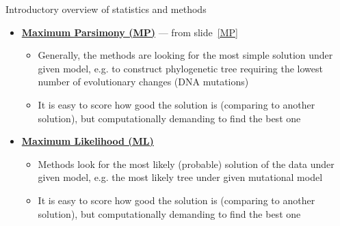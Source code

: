 \documentclass[compress, ucs, xelatex, 11pt, xcolor=svgnames,
	hyperref={
		bookmarks=true,
		unicode=true,
		colorlinks=true,
		pdftitle={Molecular data in R},
		plainpages=false,
		pdfauthor={Vojtech Zeisek},
		pdfsubject={Course about phylogeny and evolution in R},
		pdfcreator={XeLaTeX},
		pdfkeywords={R, evolution, phylogeny, molecular data},
		linkcolor=Tomato,
		anchorcolor=SaddleBrown,
		citecolor=Goldenrod,
		filecolor=DarkMagenta,
		menucolor=Sienna,
		urlcolor=DarkTurquoise,
		pdftex},
	url={hyphens, lowtilde} %
	]{beamer}
\begin{document}
\begin{frame}[allowframebreaks]{Introductory overview of statistics and methods}
\begin{itemize}
		\begin{itemize}
			\item Two variables are easily displayable in 2D xy-scatter plot (we can calculate correlation, whatever)
			\item In molecular data, each locus is more or less independent variable --- 1000~bp alignment has 1000 variables: How to display plot with 1000 axes to be able to really see something?
			\item Methods like Principal Component Analysis (\textbf{PCA}), Non-Metric Multidimensional Scaling (\textbf{NMDS}) or \textbf{PCoA} look for correlations between pairs of variables to reduce them into new variables --- after many steps new uncorrelated variables retaining maximum of original variability are constructed
			\item New variables are sorted according amount of variability they show (the decrease is very steep --- first 1--4~axes are usually enough) --- it is possible to display xy-scatter plot showing most of variability of the data
			\item Good for data display and creation of hypotheses --- not to verify them (there is no statistical test)
			\item Data are commonly scaled --- all variables are in same scale
		\end{itemize}
		\item \textbf{\href{https://en.wikipedia.org/wiki/Maximum_parsimony_(phylogenetics)}{Maximum Parsimony (MP)}} --- from slide~\ref{MP}
		\begin{itemize}
			\item Generally, the methods are looking for the most simple solution under given model, e.g. to construct phylogenetic tree requiring the lowest number of evolutionary changes (DNA mutations)
			\item It is easy to score how good the solution is (comparing to another solution), but computationally demanding to find the best one
		\end{itemize}
		\item \textbf{\href{https://en.wikipedia.org/wiki/Maximum_likelihood_estimation}{Maximum Likelihood (ML)}}
		\begin{itemize}
			\item Methods look for the most likely (probable) solution of the data under given model, e.g. the most likely tree under given mutational model
			\item It is easy to score how good the solution is (comparing to another solution), but computationally demanding to find the best one

\end{itemize}
\end{itemize}
\end{frame}
\end{document}
